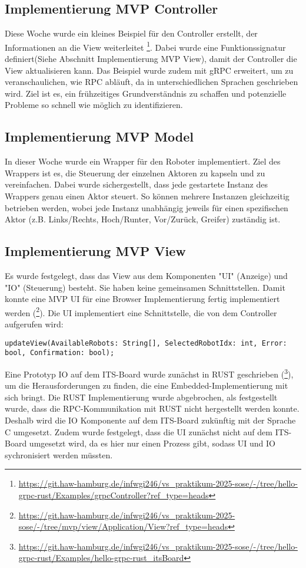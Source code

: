 \documentclass{article}
\begin{document}
\subsection{Implementierung MVP Controller} 
Diese Woche wurde ein kleines Beispiel für den Controller erstellt, der Informationen an die View weiterleitet \footnote{\url{https://git.haw-hamburg.de/infwgi246/vs_praktikum-2025-sose/-/tree/hello-grpc-rust/Examples/grpcController?ref_type=heads}}. 
Dabei wurde eine Funktionssignatur definiert(Siehe Abschnitt Implementierung MVP View), damit der Controller die View aktualisieren kann. 
Das Beispiel wurde zudem mit gRPC erweitert, um zu veranschaulichen, wie RPC abläuft, da in unterschiedlichen Sprachen geschrieben wird.
Ziel ist es, ein frühzeitiges Grundverständnis zu schaffen und potenzielle Probleme so schnell wie möglich zu identifizieren.



\subsection{Implementierung MVP Model}
In dieser Woche wurde ein Wrapper für den Roboter implementiert. 
Ziel des Wrappers ist es, die Steuerung der einzelnen Aktoren zu kapseln und zu vereinfachen. 
Dabei wurde sichergestellt, dass jede gestartete Instanz des Wrappers genau einen Aktor steuert. 
So können mehrere Instanzen gleichzeitig betrieben werden, wobei jede Instanz unabhängig jeweils für einen spezifischen Aktor (z.B. Links/Rechts, Hoch/Runter, Vor/Zurück, Greifer) zuständig ist.



\subsection{Implementierung MVP View}
Es wurde festgelegt, dass das View aus dem Komponenten "UI" (Anzeige) und "IO" (Steuerung) besteht. Sie haben keine gemeinsamen Schnittstellen.
Damit konnte eine MVP UI für eine Browser Implementierung fertig implementiert werden (\footnote{\url{https://git.haw-hamburg.de/infwgi246/vs_praktikum-2025-sose/-/tree/mvp/view/Application/View?ref_type=heads}}). Die UI implementiert eine Schnittstelle, die von dem Controller aufgerufen wird:


\begin{lstlisting}
updateView(AvailableRobots: String[], SelectedRobotIdx: int, Error: bool, Confirmation: bool);
\end{lstlisting}
Eine Prototyp IO auf dem ITS-Board wurde zunächst in RUST geschrieben (\footnote{\url{ https://git.haw-hamburg.de/infwgi246/vs_praktikum-2025-sose/-/tree/hello-grpc-rust/Examples/hello-grpc-rust_itsBoard}}), um die Herausforderungen zu finden, die eine Embedded-Implementierung mit sich bringt. Die RUST Implementierung wurde abgebrochen, als festgestellt wurde, 
dass die RPC-Kommunikation mit RUST nicht hergestellt werden konnte. Deshalb wird die IO Komponente auf dem ITS-Board zukünftig mit der Sprache C umgesetzt. Zudem wurde festgelegt, dass die UI zunächst nicht auf dem ITS-Board umgesetzt wird, 
da es hier nur einen Prozess gibt, sodass UI und IO sychronisiert werden müssten. 
\end{document}
